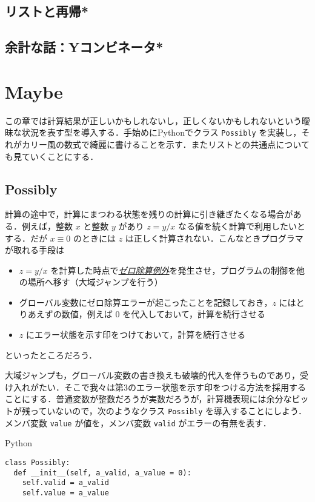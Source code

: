 \documentclass[a4paper,draft]{jsbook}
\newcommand{\programminglanguage}[1]{\textsf{#1}}
\newcommand{\python}{\programminglanguage{Python}}
\newenvironment{leader}{\begingroup}{\endgroup}
\newcommand{\keyword}[1]{{\underline{\emph{#1}}}}
\newcommand{\code}[1]{\texttt{#1}}
\newenvironment{pythoncode}{\begin{itembox}[r]{\python}}{\end{itembox}}
\begin{document}
\section{リストと再帰*}

\section{余計な話：Yコンビネータ*}


\chapter{Maybe}

\begin{leader}
この章では計算結果が正しいかもしれないし，正しくないかもしれないという曖昧な状況を表す型を導入する．手始めに\python でクラス \code{Possibly} を実装し，それがカリー風の数式で綺麗に書けることを示す．またリストとの共通点についても見ていくことにする．
\end{leader}

\section{Possibly}

計算の途中で，計算にまつわる状態を残りの計算に引き継ぎたくなる場合がある．例えば，整数 $x$ と整数 $y$ があり $z=y/x$ なる値を続く計算で利用したいとする．だが $x\equiv0$ のときには $z$ は正しく計算されない．こんなときプログラマが取れる手段は
\begin{itemize}
\item $z=y/x$ を計算した時点で\keyword{ゼロ除算例外}を発生させ，プログラムの制御を他の場所へ移す（大域ジャンプを行う）
\item グローバル変数にゼロ除算エラーが起こったことを記録しておき，$z$ にはとりあえずの数値，例えば $0$ を代入しておいて，計算を続行させる
\item $z$ にエラー状態を示す印をつけておいて，計算を続行させる
\end{itemize}
といったところだろう．

大域ジャンプも，グローバル変数の書き換えも破壊的代入を伴うものであり，受け入れがたい．そこで我々は第3のエラー状態を示す印をつける方法を採用することにする．普通変数が整数だろうが実数だろうが，計算機表現には余分なビットが残っていないので，次のようなクラス \code{Possibly} を導入することにしよう．メンバ変数 \code{value} が値を，メンバ変数 \code{valid} がエラーの有無を表す．
\begin{pythoncode}
\begin{verbatim}
class Possibly:
  def __init__(self, a_valid, a_value = 0):
    self.valid = a_valid
    self.value = a_value
\end{verbatim}
\end{pythoncode}
\end{document}
